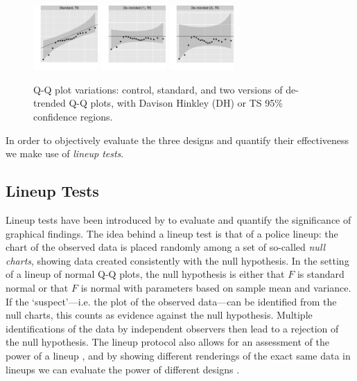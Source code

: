 \documentclass{article}\usepackage[]{graphicx}\usepackage[]{color}
\newcommand{\hh}[1]{{\color{magenta} #1}}
\begin{document}
\begin{figure}
\includegraphics[width=0.22\textwidth]{figures/qqplots-5}
\includegraphics[width=0.22\textwidth]{figures/qqplots-6}
\includegraphics[width=0.22\textwidth]{figures/qqplots-7}
\caption{ \label{qqplots} \hh{Q-Q plot variations:} control, standard, and \hh{two versions of} de-trended \hh{Q-Q plots}, with Davison Hinkley (DH) or TS 95\% confidence regions.}
\end{figure}



In order to objectively evaluate  the three designs and quantify their effectiveness we make use of {\it lineup tests}.

\subsection{Lineup Tests}
Lineup tests have been introduced by \citet{buja:2009hp} to evaluate and quantify the significance of graphical findings. The idea behind a lineup test is that of a police lineup: the chart of the observed data is placed randomly among a set of so-called \emph{null charts}, showing data created consistently with the null hypothesis. In the setting of a lineup of normal Q-Q plots, the null hypothesis  is either that $F$ is standard normal or that $F$ is normal with parameters based on sample mean and variance.
If the `suspect'---i.e. the plot of the observed data---can be identified from the null charts, this counts as evidence against the null hypothesis. Multiple identifications of the data by independent observers then lead to a rejection of the null hypothesis. 
The lineup protocol also allows for an assessment of the power of a lineup \citep{mahbub:2013},  
and by showing different renderings of the exact same data in lineups we can evaluate the power  of different designs \citep{Hofmann:2012ts}.
\end{document}
